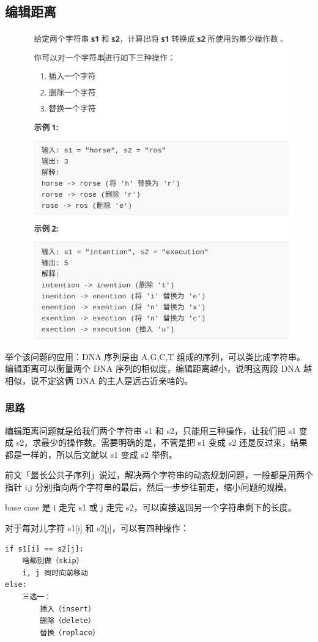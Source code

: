 \documentclass[12pt]{article}
\begin{document}
\subsection{编辑距离}
\begin{figure}[H]
    \centering
    \includegraphics[width=.8\textwidth]{fig/Dynamic_Programming_Edit_Distance_1.png}
\end{figure}
举个该问题的应用：DNA 序列是由 A,G,C,T 组成的序列，可以类比成字符串。编辑距离可以衡量两个 DNA 序列的相似度，编辑距离越小，说明这两段 DNA 越相似，说不定这俩 DNA 的主人是远古近亲啥的。
\subsubsection{思路}
编辑距离问题就是给我们两个字符串 s1 和 s2，只能用三种操作，让我们把 s1 变成 s2，求最少的操作数。需要明确的是，不管是把 s1 变成 s2 还是反过来，结果都是一样的，所以后文就以 s1 变成 s2 举例。

前文「最长公共子序列」说过，解决两个字符串的动态规划问题，一般都是用两个指针 i,j 分别指向两个字符串的最后，然后一步步往前走，缩小问题的规模。

base case 是 i 走完 s1 或 j 走完 s2，可以直接返回另一个字符串剩下的长度。

对于每对儿字符 s1[i] 和 s2[j]，可以有四种操作：
\begin{lstlisting}
if s1[i] == s2[j]:
    啥都别做（skip）
    i, j 同时向前移动
else:
    三选一：
        插入（insert）
        删除（delete）
        替换（replace）
\end{lstlisting}
\end{document}
